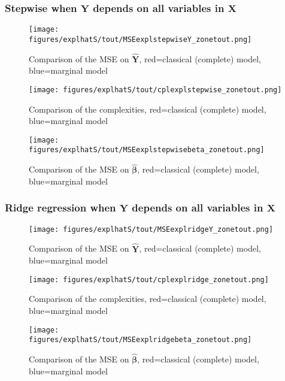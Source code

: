 \documentclass[12pt,a4paper]{report}
\begin{document}
\subsubsection{Stepwise when $\boldsymbol{Y}$ depends on all variables in $\boldsymbol{X}$}

	\begin{figure}[h!]
	\centering
		  \texttt{[image: figures/explhatS/tout/MSEexplstepwiseY\_zonetout.png]}
		\caption{Comparison of the MSE on $\hat{\boldsymbol{Y}}$, red=classical (complete) model, blue=marginal model}\label{MSEexplstepwiseY_zonetout}
	\end{figure}
	\begin{figure}[h!]
	\centering
		  \texttt{[image: figures/explhatS/tout/cplexplstepwise\_zonetout.png]}
		\caption{Comparison of the complexities, red=classical (complete) model, blue=marginal model}\label{cplexplstepwise_zonetout}
	\end{figure}
	\begin{figure}[h!]
	\centering
		  \texttt{[image: figures/explhatS/tout/MSEexplstepwisebeta\_zonetout.png]}
		\caption{Comparison of the MSE on $\hat{\boldsymbol{\beta}}$, red=classical (complete) model, blue=marginal model}\label{MSEexplstepwisebeta_zonetout}
	\end{figure}
	\FloatBarrier
\newpage
\subsubsection{Ridge regression when $\boldsymbol{Y}$ depends on all variables in $\boldsymbol{X}$}

\begin{figure}[h!]
	\centering
		  \texttt{[image: figures/explhatS/tout/MSEexplridgeY\_zonetout.png]}
		\caption{Comparison of the MSE on $\hat{\boldsymbol{Y}}$, red=classical (complete) model, blue=marginal model}\label{MSEexplridgeY_zonetout}
	\end{figure}
	\begin{figure}[h!]
	\centering
		  \texttt{[image: figures/explhatS/tout/cplexplridge\_zonetout.png]}
		\caption{Comparison of the complexities, red=classical (complete) model, blue=marginal model}\label{cplexplridge_zonetout}
	\end{figure}
	\begin{figure}[h!]
	\centering
		  \texttt{[image: figures/explhatS/tout/MSEexplridgebeta\_zonetout.png]}
		\caption{Comparison of the MSE on $\hat{\boldsymbol{\beta}}$, red=classical (complete) model, blue=marginal model}\label{MSEexplridgebeta_zonetout}
	\end{figure}
	\FloatBarrier
 
\end{document}
